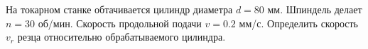 На токарном станке обтачивается цилиндр диаметра $d=80$ мм.
Шпиндель делает $n=30$ об/мин.
Скорость продольной подачи $v=0.2$ мм/с.
Определить скорость $v_{r}$ резца относительно
обрабатываемого цилиндра.
